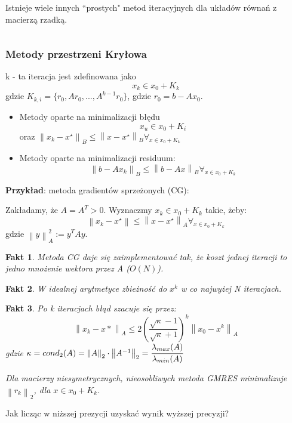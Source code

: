 \documentclass[hidelinks,a4paper,fleqn]{article}
\newcommand{\norm}[1]{\left\lVert#1\right\rVert}
\newtheorem{fakt}{Fakt}
\begin{document}
Istnieje wiele innych ``prostych" metod iteracyjnych dla układów równań z macierzą rzadką.

$\quad$ 

\subsubsection{Metody przestrzeni Kryłowa}
k - ta iteracja jest zdefinowana jako
\[
	x_k \in x_0 + K_k
\]
gdzie $K_{k, i} = \{r_0, Ar_0, ..., A^{k-1}r_0\}$, gdzie $r_0 = b - Ax_0$.

\begin{itemize}
	\item Metody oparte na minimalizacji błędu
	      \[
	      	x_u \in x_0 + K_i
	      \]
	      oraz $\norm{x_k - x^\star}_B \leq \norm{x - x^\star}_B \forall_{x \in x_0 + K_k}$ 
	\item Metody oparte na minimalizacji residuum:
	      \[
	      	\norm{b - Ax_k}_B \leq \norm{b - Ax}_B \forall_{x \in x_0 + K_k}
	      \]
\end{itemize}
	
\textbf{Przykład}: metoda gradientów sprzeżonych (CG):

Zakładamy, że $A = A^T > 0$. Wyznaczmy $x_k \in x_0 + K_k$ takie, żeby:
\[
	\norm{x_k - x^\star} \leq \norm{x - x^\star}_A \forall_{x \in x_0 + K_k}
\]
gdzie $\norm{y}_A^2 := y^T A y$.	
	
\begin{fakt} Metoda CG daje się zaimplementować tak, że koszt jednej iteracji to jedno mnożenie wektora przez A ($O(N)$).
\end{fakt}	

\begin{fakt} W idealnej arytmetyce zbieżność do $x^k$ w co najwyżej N iteracjach.
\end{fakt}	

\begin{fakt} Po k iteracjach błąd szacuje się przez:
	\[
		\norm{x_k - x*} _A \leq 2 \left(\frac{\sqrt{\kappa} - 1}{\sqrt{\kappa} + 1}\right)^k \norm{x_0 - x^k}_A
	\]
	gdzie $\kappa = cond_2(A) = \norm{A} _2 \cdot \norm{A^{-1}}_2 = \cfrac{\lambda_{max}(A)}{\lambda_{min}(A)}$
	
	Dla macierzy niesymetrycznych, nieosobliwych metoda GMRES minimalizuje $\norm{r_k}_2$, dla $x \in x_0 + K_k$.
\end{fakt}

Jak licząc w niższej prezycji uzyskać wynik wyższej precyzji?
\end{document}
